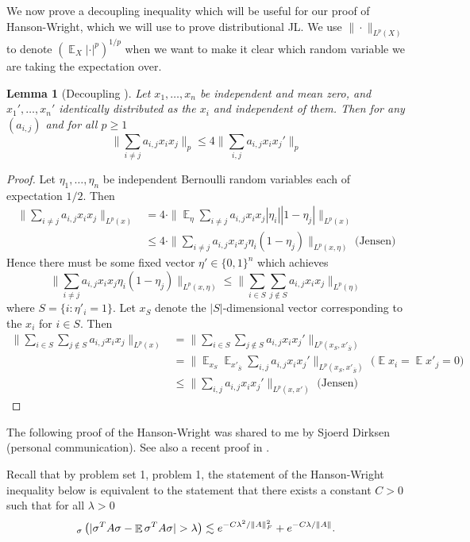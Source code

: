 \documentclass[11pt]{article}
\DeclareMathOperator*{\E}{\mathbb{E}}
\let\Pr\relax
\DeclareMathOperator*{\Pr}{\mathbb{P}}
\newtheorem{lemma}[theorem]{Lemma}
\newcommand{\EquationName}[1]{\label{eq:#1}}
\begin{document}
We now prove a decoupling inequality which will be useful for our proof of Hanson-Wright, which we will use to prove distributional JL. We use $\|\cdot\|_{L^p(X)}$ to denote $(\E_X|\cdot|^p)^{1/p}$ when we want to make it clear which random variable we are taking the expectation over.

\begin{lemma}[Decoupling {\cite{PenaG99}}]
Let $x_1,\ldots,x_n$ be independent and mean zero, and $x_1',\ldots,x_n'$ identically distributed as the $x_i$ and independent of them. Then for any $(a_{i,j})$ and for all $p\ge 1$
$$
\|\sum_{i\neq j} a_{i,j} x_i x_j\|_p \le 4 \|\sum_{i,j} a_{i ,j} x_i x_j'\|_p
$$
\end{lemma}
\begin{proof}
Let $\eta_1,\ldots,\eta_n$ be independent Bernoulli random variables each of expectation $1/2$. Then
\begin{align}
\nonumber \|\sum_{i\neq j} a_{i,j} x_i x_j\|_{L^p(x)} &= 4\cdot \|\E_\eta \sum_{i\neq j} a_{i,j} x_i x_j |\eta_i| |1-\eta_j|\|_{L^p(x)}\\
{}&\le 4\cdot \|\sum_{i\neq j} a_{i,j} x_i x_j \eta_i (1-\eta_j)\|_{L^p(x,\eta)} \text{ (Jensen)}\EquationName{decouple-averaging}
\end{align}
Hence there must be some fixed vector $\eta'\in\{0,1\}^n$ which achieves
$$
\|\sum_{i\neq j} a_{i,j} x_i x_j \eta_i (1-\eta_j)\|_{L^p(x,\eta)}\le \|\sum_{i\in S}\sum_{j\notin S} a_{i,j} x_i x_j\|_{L^p(\eta)}
$$
where $S = \{ i : \eta'_i = 1\}$. Let $x_S$ denote the $|S|$-dimensional vector corresponding to the $x_i$ for $i\in S$.  Then
\begin{align*}
\|\sum_{i\in S}\sum_{j\notin S} a_{i,j} x_i x_j\|_{L^p(x)} &= \|\sum_{i\in S}\sum_{j\notin S} a_{i,j} x_i x_j'\|_{L^p(x_S,x'_{\bar{S}})}\\
{}& = \|\E_{x_S}\E_{x'_{\bar{S}}}\sum_{i, j}a_{i,j} x_i x_j'\|_{L^p(x_S,x'_{\bar{S}})}\text{ (}\E x_i = \E x'_j = 0\text{)}\\
{}&\le \|\sum_{i, j}a_{i,j} x_i x_j'\|_{L^p(x,x')}\text{ (Jensen)}
\end{align*}
\end{proof}

The following proof of the Hanson-Wright was shared to me by Sjoerd Dirksen (personal communication). See also a recent proof in \cite{RudelsonV13}.

Recall that by problem set 1, problem 1, the statement of the Hanson-Wright inequality below is equivalent to the statement that there exists a constant $C>0$ such that for all $\lambda > 0$
\begin{equation}
\Pr_\sigma\left(|\sigma^T A\sigma - \E\sigma^T A\sigma| > \lambda\right) \lesssim e^{-C\lambda^2/\|A\|_F^2} + e^{-C\lambda/\|A\|} . \label{eqn:hw-equiv}
\end{equation}
\end{document}

